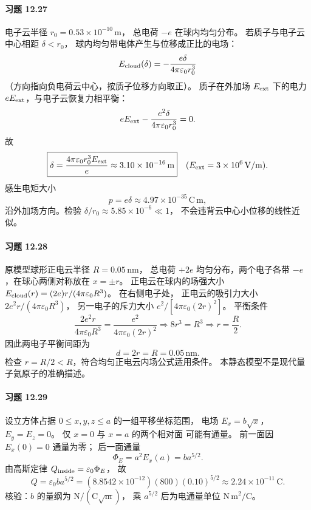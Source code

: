 \paragraph{习题 12.27}
电子云半径 \(r_0=0.53\times10^{-10}\,\mathrm m\)，
总电荷 \(-e\) 在球内均匀分布。
若质子与电子云中心相距 \(\delta<r_0\)，
球内均匀带电体产生与位移成正比的电场：
\[
 E_{\rm cloud}(\delta)=
 -\frac{e\delta}{4\pi\varepsilon_0r_0^3}
\]
（方向指向负电荷云中心，按质子位移方向取正）。
质子在外加场 \(E_{\rm ext}\) 下的电力
\(eE_{\rm ext}\)，与电子云恢复力相平衡：
\[
 eE_{\rm ext}-\frac{e^2\delta}
 {4\pi\varepsilon_0r_0^3}=0.
\]
故
\[
 \boxed{\delta=
 \frac{4\pi\varepsilon_0r_0^3E_{\rm ext}}{e}
 \approx3.10\times10^{-16}\,\mathrm m}
 \quad(E_{\rm ext}=3\times10^6\,\mathrm{V/m}).
\]
感生电矩大小
\[
 \boxed{p=e\delta\approx4.97\times10^{-35}\,\mathrm{C\,m}},
\]
沿外加场方向。检验
\(\delta/r_0\approx5.85\times10^{-6}\ll1\)，
不会违背云中心小位移的线性近似。

\paragraph{习题 12.28}
原模型球形正电云半径 \(R=0.05\,\mathrm{nm}\)，
总电荷 \(+2e\) 均匀分布，两个电子各带
\(-e\)，在球心两侧对称放在
\(x=\pm r\)。
正电云在球内的场强大小
\(E_{\rm cloud}(r)=
 (2e)r/(4\pi\varepsilon_0R^3)\)。
在右侧电子处，
正电云的吸引力大小
\(2e^2r/(4\pi\varepsilon_0R^3)\)，
另一电子的斥力大小
\(e^2/[4\pi\varepsilon_0(2r)^2]\)。
平衡条件
\[
 \frac{2e^2r}{4\pi\varepsilon_0R^3}
 =\frac{e^2}{4\pi\varepsilon_0(2r)^2}
 \Longrightarrow 8r^3=R^3
 \Longrightarrow r=\frac R2.
\]
因此两电子平衡间距为
\[
 \boxed{d=2r=R=0.05\,\mathrm{nm}}.
\]
检查 \(r=R/2<R\)，符合均匀正电云内场公式适用条件。
本静态模型不是现代量子氦原子的准确描述。

\paragraph{习题 12.29}
设立方体占据
\(0\le x,y,z\le a\) 的一组平移坐标范围，
电场 \(E_x=b\sqrt x\)，
\(E_y=E_z=0\)。
仅 \(x=0\) 与 \(x=a\) 的两个相对面
可能有通量。
前一面因 \(E_x(0)=0\) 通量为零；
后一面通量
\[
 \boxed{\Phi_E=a^2E_x(a)
 =ba^{5/2}}.
\]
由高斯定律
\(Q_{\rm inside}=\varepsilon_0\Phi_E\)，
故
\[
 \boxed{Q=\varepsilon_0ba^{5/2}
 =(8.8542\times10^{-12})(800)(0.10)^{5/2}
 \approx2.24\times10^{-11}\,\mathrm C}.
\]
核验：\(b\) 的量纲为
\(\mathrm{N/(C\sqrt m)}\)，
乘 \(a^{5/2}\) 后为电通量单位
\(\mathrm{N\,m^2/C}\)。

